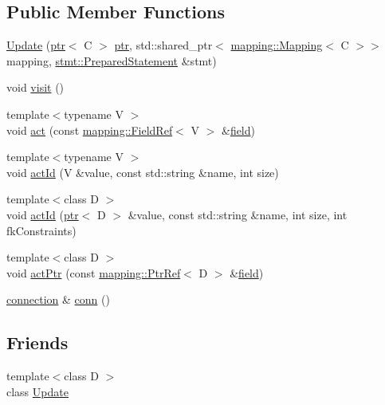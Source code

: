 \subsection*{Public Member Functions}
\begin{DoxyCompactItemize}
\item 
\hyperlink{classdbo_1_1action_1_1_update_aab7708faf49011e9f40b07ed389abc8e}{Update} (\hyperlink{classdbo_1_1ptr}{ptr}$<$ C $>$ \hyperlink{classdbo_1_1ptr}{ptr}, std\+::shared\+\_\+ptr$<$ \hyperlink{classdbo_1_1mapping_1_1_mapping}{mapping\+::\+Mapping}$<$ C $>$$>$ mapping, \hyperlink{classdbo_1_1stmt_1_1_prepared_statement}{stmt\+::\+Prepared\+Statement} \&stmt)
\item 
void \hyperlink{classdbo_1_1action_1_1_update_aafb60921a5d7d4508b9356637e7aeaa1}{visit} ()
\item 
{\footnotesize template$<$typename V $>$ }\\void \hyperlink{classdbo_1_1action_1_1_update_a1c18a9ecafe6f92586e60c4c6c10e05d}{act} (const \hyperlink{classdbo_1_1mapping_1_1_field_ref}{mapping\+::\+Field\+Ref}$<$ V $>$ \&\hyperlink{namespacedbo_ad1f50f02cb050acf946807959252a93f}{field})
\item 
{\footnotesize template$<$typename V $>$ }\\void \hyperlink{classdbo_1_1action_1_1_update_a86d4d6a33f11bbf22dc4bea748c1e555}{act\+Id} (V \&value, const std\+::string \&name, int size)
\item 
{\footnotesize template$<$class D $>$ }\\void \hyperlink{classdbo_1_1action_1_1_update_aa86b704191e37df75e8c7927c5ded490}{act\+Id} (\hyperlink{classdbo_1_1ptr}{ptr}$<$ D $>$ \&value, const std\+::string \&name, int size, int fk\+Constraints)
\item 
{\footnotesize template$<$class D $>$ }\\void \hyperlink{classdbo_1_1action_1_1_update_a045d466453a9411faa348b071af0ccdf}{act\+Ptr} (const \hyperlink{classdbo_1_1mapping_1_1_ptr_ref}{mapping\+::\+Ptr\+Ref}$<$ D $>$ \&\hyperlink{namespacedbo_ad1f50f02cb050acf946807959252a93f}{field})
\item 
\hyperlink{classdbo_1_1connection}{connection} \& \hyperlink{classdbo_1_1action_1_1_update_a8983e7608f961b79732b6b60a140afd5}{conn} ()
\end{DoxyCompactItemize}
\subsection*{Friends}
\begin{DoxyCompactItemize}
\item 
{\footnotesize template$<$class D $>$ }\\class \hyperlink{classdbo_1_1action_1_1_update_a440e8361659c899ef7f0651ec5ea49e8}{Update}
\end{DoxyCompactItemize}


